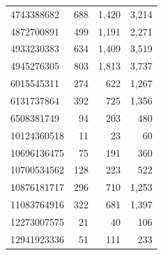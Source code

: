 \documentclass[12pt]{article}
\begin{document}
\begin{table}[htbp]
\begin{tabular}{lrrr}
    4743388682        & 688                   & 1,420                 & 3,214                  \\
    4872700891        & 499                   & 1,191                 & 2,271                  \\
    4933230383        & 634                   & 1,409                 & 3,519                  \\
    4945276305        & 803                   & 1,813                 & 3,737                  \\
    6015545311        & 274                   & 622                   & 1,267                  \\
    6131737864        & 392                   & 725                   & 1,356                  \\
    6508381749        & 94                    & 203                   & 480                    \\
    10124360518       & 11                    & 23                    & 60                     \\
    10696136475       & 75                    & 191                   & 360                    \\
    10700534562       & 128                   & 223                   & 522                    \\
    10876181717       & 296                   & 710                   & 1,253                  \\
    11083764916       & 322                   & 681                   & 1,397                  \\
    12273007575       & 21                    & 40                    & 106                    \\
    12941923336       & 51                    & 111                   & 233                    \\
    \bottomrule
  \end{tabular}
\end{table}
\end{document}
